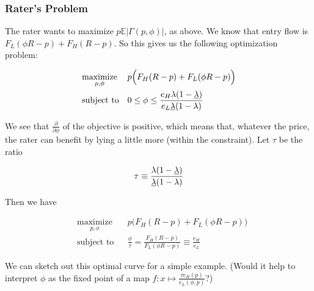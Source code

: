 \documentclass{article}
\begin{document}
\subsubsection*{Rater's Problem}

The rater wants to maximize $p \mathbb{E} | \Gamma(p, \phi) |$, as above. We know that entry flow is $F_L(\phi R - p) + F_H(R - p)$. So this gives us the following optimization problem: 

\begin{equation}
    \begin{aligned}
    & \underset{p, \phi}{\text{maximize}}
    & & p \Big(F_H(R - p) + F_L(\phi R - p)\Big) \\
    & \text{subject to}
    & & 0 \leq \phi \leq \frac{e_H \lambda (1 - \uline{\lambda})}{e_L \uline{\lambda} (1 - \lambda)}
    \end{aligned}
\end{equation}

We see that $\frac{\partial}{\partial \phi}$ of the objective is positive, which means that, whatever the price, the rater can benefit by lying a little more (within the constraint). Let $\tau$ be the ratio 

\begin{equation}
    \tau \equiv \frac{\lambda(1-\uline{\lambda})}{\uline{\lambda}(1-\lambda)}
\end{equation}

Then we have 

\begin{equation}
    \begin{aligned}
    & \underset{p, \phi}{\text{maximize}}
    & & p \Big(F_H(R - p) + F_L(\phi R - p)\Big) \\
    & \text{subject to}
    & & \frac{\phi}{\tau} = \frac{F_H(R-p)}{F_L(\phi R - p)} \equiv \frac{e_H}{e_L}
    \end{aligned}
\end{equation}

We can sketch out this optimal curve for a simple example. (Would it help to interpret $\phi$ as the fixed point of a map $f: x \mapsto \frac{\tau e_H(p)}{e_L(\phi, p)}$?)

\newpage 


\end{document}
